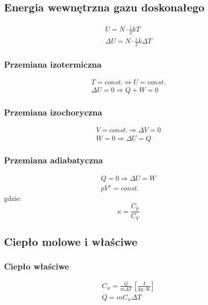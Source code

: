 \documentclass{article}
\numberwithin{equation}{section}
\newcommand{\unit}[1]{\, \left[\mathrm{#1}\right]}
\begin{document}
    \subsection{Energia wewnętrzna gazu doskonałego}
      \begin{gather}
        U = N\cdot\frac{i}{2}kT\\
        \Delta U = N\cdot\frac{i}{2}k\Delta T
      \end{gather}
      \subsubsection{Przemiana izotermiczna}
        \begin{gather}
          T = const. \Leftrightarrow U = const.\\
          \Delta U = 0 \Rightarrow Q + W = 0
        \end{gather}
      \subsubsection{Przemiana izochoryczna}
        \begin{gather}
          V = const. \Rightarrow \Delta V = 0\\
          W = 0 \Rightarrow \Delta U = Q
        \end{gather}
      \subsubsection{Przemiana adiabatyczna}
        \begin{gather}
          Q = 0 \Rightarrow \Delta U = W\\
          pV^\kappa = const.
        \end{gather}
        gdzie:
        \begin{equation}
          \kappa = \frac{C_p}{C_V}
        \end{equation}
    \subsection{Ciepło molowe i właściwe}
      \subsubsection{Ciepło właściwe}
        \begin{gather}
          C_w = \frac{Q}{m\Delta T} \unit{\frac{J}{kg\cdot K}}\\
          Q = mC_w\Delta T
        \end{gather}
\end{document}
